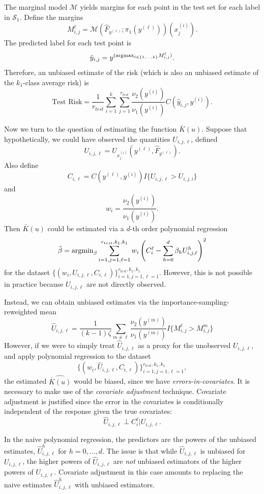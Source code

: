 \documentclass[12pt]{article}
\begin{document}
The marginal model $\mathcal{M}$ yields margins for each point in the
test set for each label in $\mathcal{S}_1$.  Define the margins
\[
M_{i, j}^\ell = \mathcal{M}(\hat{F}_{y^{(\ell)}}; \pi_1(y^{(\ell)}))(x_j^{(i)}).
\]
The predicted label for each test point is
\[
\hat{y}_{i,j} = y^{(\text{argmax}_{\ell \in \{1,\hdots, k\}} M_{i, j}^\ell)}.
\]
Therefore, an unbiased estimate of the risk (which is also an unbiased
estimate of the $k_1$-class average risk) is
\[
\text{Test Risk} = \frac{1}{r_{test}}\sum_{i=1}^k \sum_{j=1}^{r_{test}} \frac{\nu_2(y^{(i)})}{\nu_1(y^{(i)})} C(\hat{y}_{i, j}, y^{(i)}).
\]

Now we turn to the question of estimating the function $\bar{K}(u)$.
Suppose that hypothetically, we could have observed the quantities
$U_{i, j, \ell}$, defined
\[
U_{i, j, \ell} = U_{x_j^{(i)}}(y^{(\ell)}, \hat{F}_{y^{(\ell)}}).
\]
Also define
\[
C_{i,\ell} = C(y^{(\ell)}, y^{(i)})I\{U_{i, j, \ell} > U_{i, j, i}\}
\]
and
\[
w_i = \frac{\nu_2(y^{(i)})}{\nu_1(y^{(i)})}.
\]
Then $\bar{K}(u)$ could be estimated via a $d$-th order polynomial regression
\[
\hat{\beta} = \text{argmin}_{\beta} \sum_{i=1,j=1, \ell=1}^{r_{test}, k_1, k_1} w_i \left(C_i^\ell - \sum_{h=0}^d \beta_h U_{i,j, \ell}^h\right)^2
\]
for the
dataset $\{(w_i, U_{i,j, \ell}, C_{i,\ell})\}_{i=1, j=1,
  \ell=1}^{r_{test}, k_1, k_1}$.  However, this is not possible in
practice because $U_{i,j,\ell}$ are not directly observed.

Instead, we can obtain unbiased estimates via the importance-sampling-reweighted mean
\[
\hat{U}_{i,j, \ell} = \frac{1}{(k-1)\zeta}\sum_{m \neq \ell}  \frac{\nu_2(y^{(m)})}{\nu_1(y^{(m)})} I\{M_{i, j}^\ell > M_{i, j}^m\}
\]
However, if we were to simply treat $\hat{U}_{i, j, \ell}$ as a proxy
for the unobserved $U_{i,j,\ell}$, and apply polynomial regression to
the dataset
\[
\{(w_i, \hat{U}_{i,j, \ell}, C_{i, \ell})\}_{i=1, j=1, \ell=1}^{r_{test}, k_1,k_1},
\]
the estimated $\widehat{\bar{K}(u)}$ would be biased, since we have
\emph{errors-in-covariates}.  It is necessary to make use of the
\emph{covariate adjustment} technique.  Covariate adjustment is
justified since the error in the covariates is conditionally
independent of the response given the true covariates:
\[
\hat{U}_{i,j,\ell} \perp C_i^\ell | U_{i, j,\ell}.
\]

In the naive polynomial regression, the predictors are the powers of
the unbiased estimates, $\hat{U}_{i,j,\ell}^h$ for $h = 0,\hdots, d$.
The issue is that while $\hat{U}_{i,j,\ell}$ is unbiased for
$U_{i,j,\ell}$, the higher powers of $\hat{U}_{i,j,\ell}$ are
\emph{not} unbiased estimators of the higher powers of $U_{i,j,\ell}$.
Covariate adjustment in this case amounts to replacing the naive
estimates $\hat{U}_{i,j,\ell}^h$ with unbiased estimators.
\end{document}
